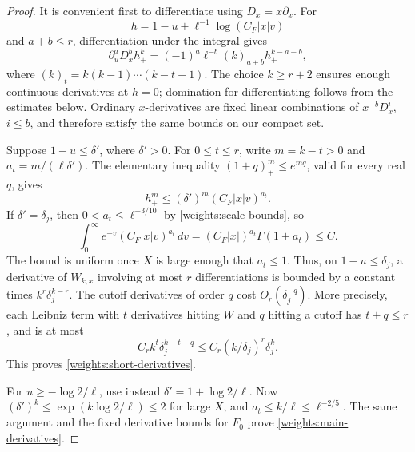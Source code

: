 \begin{proof}
It is convenient first to differentiate using
\(D_x=x\partial_x\). For
\[
 h=1-u+\ell^{-1}\log(C_F|x|v)
\]
and \(a+b\le r\), differentiation under the integral gives
\begin{equation}
 \partial_u^aD_x^b h_+^k
    =(-1)^a\ell^{-b}(k)_{a+b}h_+^{k-a-b},
 \label{weights:power-derivative}
\end{equation}
where \((k)_t=k(k-1)\cdots(k-t+1)\).
The choice \(k\ge r+2\) ensures enough continuous derivatives at
\(h=0\); domination for differentiating follows from the estimates
below. Ordinary \(x\)-derivatives are fixed linear combinations of
\(x^{-b}D_x^i\), \(i\le b\), and therefore satisfy the same bounds on
our compact set.

Suppose \(1-u\le\delta'\), where \(\delta'>0\). For \(0\le t\le r\),
write \(m=k-t>0\) and \(a_t=m/(\ell\delta')\). The elementary
inequality \((1+q)_+^m\le e^{mq}\), valid for every real \(q\), gives
\begin{equation}
 h_+^m
    \le(\delta')^m(C_F|x|v)^{a_t}.
 \label{weights:gamma-majorant}
\end{equation}
If \(\delta'=\delta_j\), then \(0<a_t\le\ell^{-3/10}\) by
\eqref{weights:scale-bounds}, so
\[
 \int_0^\infty e^{-v}(C_F|x|v)^{a_t}\,dv
       =(C_F|x|)^{a_t}\Gamma(1+a_t)\le C.
\]
The bound is uniform once \(X\) is large enough that \(a_t\le1\).
Thus, on \(1-u\le\delta_j\), a derivative of \(W_{k,x}\) involving at
most \(r\) differentiations is bounded by a constant times
\(k^r\delta_j^{k-r}\).
The cutoff derivatives of order \(q\) cost \(O_r(\delta_j^{-q})\).
More precisely, each Leibniz term with \(t\) derivatives hitting
\(W\) and \(q\) hitting a cutoff has \(t+q\le r\), and is at most
\[
 C_r k^t\delta_j^{k-t-q}
       \le C_r(k/\delta_j)^r\delta_j^k.
\]
This proves \eqref{weights:short-derivatives}.

For \(u\ge-\log2/\ell\), use instead
\(\delta'=1+\log2/\ell\). Now
\((\delta')^k\le\exp(k\log2/\ell)\le2\) for large \(X\), and
\(a_t\le k/\ell\le\ell^{-2/5}\).
The same argument and the fixed derivative bounds for \(F_0\)
prove \eqref{weights:main-derivatives}.


\end{proof}
